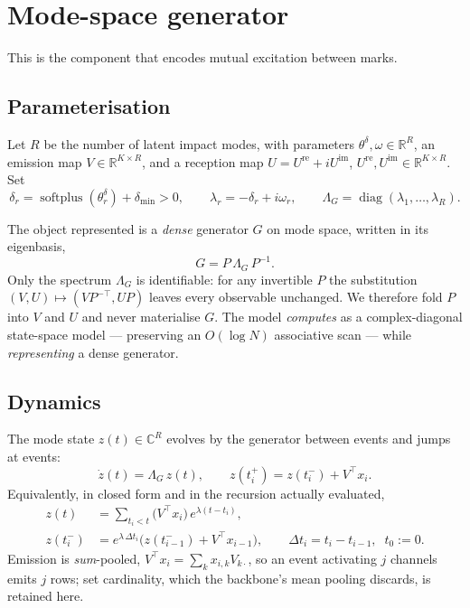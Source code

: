 \documentclass[11pt]{article}
\theoremstyle{remark}
\newcommand{\R}{\mathbb{R}}
\newcommand{\C}{\mathbb{C}}
\newcommand{\softplus}{\operatorname{softplus}}
\newcommand{\diag}{\operatorname{diag}}
\begin{document}
\section{Mode-space generator}

This is the component that encodes mutual excitation between marks.

\subsection{Parameterisation}

Let $R$ be the number of latent impact modes, with parameters
$\theta^\delta,\omega\in\R^{R}$, an emission map $V\in\R^{K\times R}$, and a
reception map $U=U^{\mathrm{re}}+iU^{\mathrm{im}}$, $U^{\mathrm{re}},
U^{\mathrm{im}}\in\R^{K\times R}$. Set
\begin{equation}
\delta_r=\softplus(\theta^\delta_r)+\delta_{\min}>0,
\qquad
\lambda_r=-\delta_r+i\omega_r,
\qquad
\Lambda_G=\diag(\lambda_1,\dots,\lambda_R).
\end{equation}

The object represented is a \emph{dense} generator $G$ on mode space, written in
its eigenbasis,
\begin{equation}
G=P\,\Lambda_G\,P^{-1}.
\label{eq:eigen}
\end{equation}
Only the spectrum $\Lambda_G$ is identifiable: for any invertible $P$ the
substitution $(V,U)\mapsto(VP^{-\top},UP)$ leaves every observable unchanged.
We therefore fold $P$ into $V$ and $U$ and never materialise $G$. The model
\emph{computes} as a complex-diagonal state-space model --- preserving an
$O(\log N)$ associative scan --- while \emph{representing} a dense generator.

\subsection{Dynamics}

The mode state $z(t)\in\C^{R}$ evolves by the generator between events and jumps
at events:
\begin{equation}
\boxed{\;\dot z(t)=\Lambda_G\,z(t),
\qquad
z(t_i^{+})=z(t_i^{-})+V^{\!\top}x_i .\;}
\label{eq:dynamics}
\end{equation}
Equivalently, in closed form and in the recursion actually evaluated,
\begin{align}
z(t)&=\sum_{t_i<t}\big(V^{\!\top}x_i\big)\,e^{\lambda(t-t_i)},
\label{eq:zclosed}\\
z(t_i^{-})&=e^{\lambda\,\Delta t_i}\Big(z(t_{i-1}^{-})+V^{\!\top}x_{i-1}\Big),
\qquad \Delta t_i=t_i-t_{i-1},\;\;t_0:=0 .
\label{eq:zrec}
\end{align}
Emission is \emph{sum}-pooled, $V^{\!\top}x_i=\sum_k x_{i,k}V_{k\cdot}$, so an
event activating $j$ channels emits $j$ rows; set cardinality, which the
backbone's mean pooling discards, is retained here.
\end{document}
